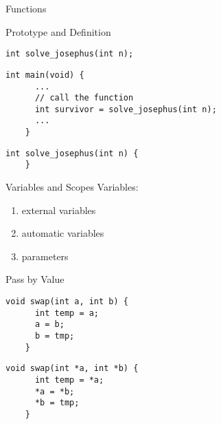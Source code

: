 \begin{frame}{}
  \centerline{\LARGE Functions}
\end{frame}

\begin{frame}[fragile]{Prototype and Definition}
  \begin{lstlisting}[style = Cstyle]
    int solve_josephus(int n);
  \end{lstlisting}

  \vspace{0.20cm}
  \begin{lstlisting}[style = Cstyle]
    int main(void) {
      ...
      // call the function
      int survivor = solve_josephus(int n);
      ...
    }
  \end{lstlisting}

  \vspace{0.20cm}
  \begin{lstlisting}[style = Cstyle]
    int solve_josephus(int n) {
    }
  \end{lstlisting}
\end{frame}

\begin{frame}[fragile]{Variables and Scopes}
  Variables:
  \begin{enumerate}
    \item external variables
    \item automatic variables
    \item parameters
  \end{enumerate}
\end{frame}

\begin{frame}[fragile]{Pass by Value}
  \begin{lstlisting}[style = Cstyle]
    void swap(int a, int b) {
      int temp = a;
      a = b;
      b = tmp;
    }
  \end{lstlisting}

  \vspace{0.40cm}
  \pause
  \begin{lstlisting}[style = Cstyle]
    void swap(int *a, int *b) {
      int temp = *a;
      *a = *b;
      *b = tmp;
    }
  \end{lstlisting}
\end{frame}
